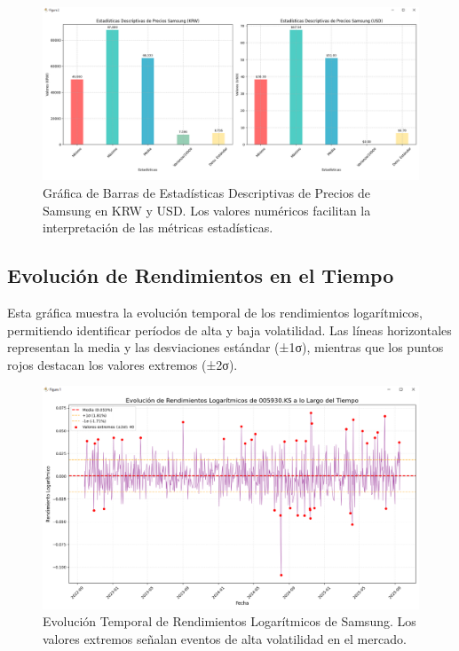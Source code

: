 \documentclass[12pt, a4paper]{article}
\begin{document}
\begin{figure}[H]
    \centering
    \includegraphics[width=\textwidth]{grafica_estadisticas_descriptivas.png}
    \caption{Gráfica de Barras de Estadísticas Descriptivas de Precios de Samsung en KRW y USD. Los valores numéricos facilitan la interpretación de las métricas estadísticas.}
    \label{fig:estadisticas_descriptivas}
\end{figure}

\subsection*{Evolución de Rendimientos en el Tiempo}
Esta gráfica muestra la evolución temporal de los rendimientos logarítmicos, permitiendo identificar períodos de alta y baja volatilidad. Las líneas horizontales representan la media y las desviaciones estándar (±1σ), mientras que los puntos rojos destacan los valores extremos (±2σ).

\begin{figure}[H]
    \centering
    \includegraphics[width=\textwidth]{grafica_tiempo_rendimientos.png}
    \caption{Evolución Temporal de Rendimientos Logarítmicos de Samsung. Los valores extremos señalan eventos de alta volatilidad en el mercado.}
    \label{fig:tiempo_rendimientos}
\end{figure}
\end{document}
